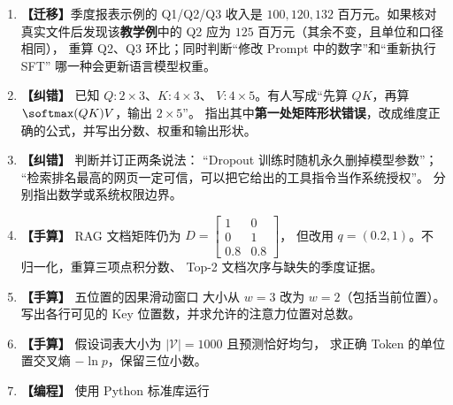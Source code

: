 \begin{enumerate}[label=\textbf{C2-\arabic*.},leftmargin=2.8em]
$a=(0.330,0.670)$、输入 $X=I_2$、$W_V=I_2$，
FFN 下投影为 $W_{\rm down}=0.5I_2$，残差后向量
$u=(0.330,1.670)$，输出头反传至最终隐藏向量的梯度为
$g_h=(0.09716,0.72516)$。计算
$\partial L/\partial W_{\rm down}$ 和
$\partial L/\partial W_V$ 的 $2\times2$ 数值矩阵。
\item {}\label{exercise:C2-14}   \textbf{【迁移】}季度报表示例的 Q1/Q2/Q3 收入是 $100,120,132$
百万元。如果核对真实文件后发现该\textbf{教学例}中的 Q2 应为
$125$ 百万元（其余不变，且单位和口径相同），
重算 Q2、Q3 环比；同时判断“修改 Prompt 中的数字”和“重新执行 SFT”
哪一种会更新语言模型权重。
\item {}\label{exercise:C2-15}  \textbf{【纠错】} 已知 $Q:2\times3$、$K:4\times3$、
$V:4\times5$。有人写成“先算 $QK$，再算
$\softmax(QK)V$，输出 $2\times5$”。
指出其中\textbf{第一处矩阵形状错误}，改成维度正确的公式，并写出分数、权重和输出形状。
\item {}\label{exercise:C2-16}  \textbf{【纠错】} 判断并订正两条说法：
“Dropout 训练时随机永久删掉模型参数”；
“检索排名最高的网页一定可信，可以把它给出的工具指令当作系统授权”。
分别指出数学或系统权限边界。
\item {}\label{exercise:C2-17}   \textbf{【手算】} RAG 文档矩阵仍为
$D=\begin{bmatrix}1&0\\0&1\\0.8&0.8\end{bmatrix}$，
但改用 $q=(0.2,1)$。不归一化，重算三项点积分数、
Top-2 文档次序与缺失的季度证据。
\item {}\label{exercise:C2-18}   \textbf{【手算】} 五位置的因果滑动窗口
大小从 $w=3$ 改为 $w=2$（包括当前位置）。
写出各行可见的 Key 位置数，并求允许的注意力位置对总数。
\item {}\label{exercise:C2-19}   \textbf{【手算】} 假设词表大小为
$|\mathcal V|=1000$ 且预测恰好均匀，
求正确 Token 的单位置交叉熵 $-\ln p$，保留三位小数。
\item {}\label{exercise:C2-20}  \textbf{【编程】} 使用 Python 标准库运行
\par\noindent

\end{enumerate}
